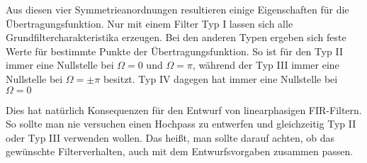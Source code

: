 Aus diesen vier Symmetrieanordnungen resultieren einige Eigenschaften für die Übertragungsfunktion.
Nur mit einem Filter Typ I lassen sich alle Grundfiltercharakteristika erzeugen. Bei den anderen Typen
ergeben sich feste Werte für bestimmte Punkte der Übertragungsfunktion. So ist für den Typ II immer eine
Nullstelle bei $\Omega = 0$ und $\Omega = \pi$, während der Typ III immer eine Nullstelle bei
$\Omega = \pm \pi$ besitzt. Typ IV  dagegen hat immer eine Nullstelle bei $\Omega = 0$

Dies hat natürlich Konsequenzen für den Entwurf von linearphasigen FIR-Filtern. So sollte man nie versuchen
einen Hochpass zu entwerfen und gleichzeitig Typ II oder Typ III verwenden wollen. Das heißt, man sollte
darauf achten, ob das gewünschte Filterverhalten, auch mit dem Entwurfsvorgaben zusammen passen.

